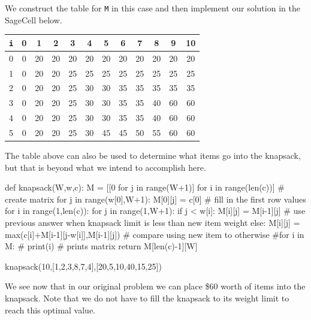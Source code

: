 \documentclass{ximera}
\begin{document}
We construct the table for \verb|M| in this case and then implement our solution in the SageCell below.

\begin{center}
	\begin{tabular}{|c|c|c|c|c|c|c|c|c|c|c|c|}
		\hline
	\verb|i|  & 0 & 1 & 2 & 3 & 4 & 5 & 6 & 7 & 8 & 9 & 10\\
		\hline
		\hline
	0 & 0  & 20  & 20  & 20  & 20  & 20  & 20  & 20  & 20  & 20  & 20  \\
		\hline
	1 & 0  & 20  & 20  & 25  & 25  & 25  & 25  & 25  & 25  & 25  & 25  \\
		\hline
        2 & 0  & 20  & 20  & 25  & 30  & 30  & 35  & 35  & 35  & 35  & 35  \\
		\hline
	3 & 0  & 20  & 20  & 25  & 30  & 30  & 35  & 35  & 40  & 60  & 60  \\
		\hline
	4 & 0  & 20  & 20  & 25  & 30  & 30  & 35  & 35  & 40  & 60  & 60  \\
		\hline
	5 & 0  & 20  & 20  & 25  & 30  & 45  & 45  & 50  & 55  & 60  & 60  \\
		\hline
	\end{tabular}
\end{center}

The table above can also be used to determine what items go into the knapsack, but that is beyond what we intend to accomplish here. 
\begin{sageCell}
def knapsack(W,w,c):
        M = [[0 for j in range(W+1)] for i in range(len(c))] # create matrix
        for j in range(w[0],W+1):                            
                M[0][j] = c[0]                               # fill in the first row values
        for i in range(1,len(c)):
                for j in range(1,W+1):
                        if j < w[i]:  
                                M[i][j] = M[i-1][j]          # use previous answer when knapsack limit is less than new item weight
                        else:
                                M[i][j] = max(c[i]+M[i-1][j-w[i]],M[i-1][j]) # compare using new item to otherwise
	#for i in M:           
	#        print(i)      # prints matrix
        return M[len(c)-1][W]

knapsack(10,[1,2,3,8,7,4],[20,5,10,40,15,25])
\end{sageCell}

We see now that in our original problem we can place \$60 worth of items into the knapsack. Note that we do not have to fill the knapsack to its weight limit to reach this optimal value.
\end{document}

